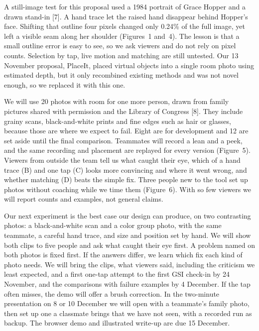 \documentclass[10pt,letterpaper]{article}
\begin{document}
A still-image test for this proposal used a 1984 portrait of Grace Hopper and a drawn stand-in [7]. A hand trace let the raised hand disappear behind Hopper's face. Shifting that outline four pixels changed only 0.24\% of the full image, yet left a visible seam along her shoulder (Figures~1 and~4). The lesson is that a small outline error is easy to see, so we ask viewers and do not rely on pixel counts. Selection by tap, live motion and matching are still untested. Our 13 November proposal, PlaceIt, placed virtual objects into a single room photo using estimated depth, but it only recombined existing methods and was not novel enough, so we replaced it with this one.

We will use 20 photos with room for one more person, drawn from family pictures shared with permission and the Library of Congress [8]. They include grainy scans, black-and-white prints and fine edges such as hair or glasses, because those are where we expect to fail. Eight are for development and 12 are set aside until the final comparison. Teammates will record a lean and a peek, and the same recording and placement are replayed for every version (Figure~5). Viewers from outside the team tell us what caught their eye, which of a hand trace (B) and one tap (C) looks more convincing and where it went wrong, and whether matching (D) beats the simple fix. Three people new to the tool set up photos without coaching while we time them (Figure~6). With so few viewers we will report counts and examples, not general claims.

Our next experiment is the best case our design can produce, on two contrasting photos: a black-and-white scan and a color group photo, with the same teammate, a careful hand trace, and size and position set by hand. We will show both clips to five people and ask what caught their eye first. A problem named on both photos is fixed first. If the answers differ, we learn which fix each kind of photo needs. We will bring the clips, what viewers said, including the criticism we least expected, and a first one-tap attempt to the first GSI check-in by 24 November, and the comparisons with failure examples by 4 December. If the tap often misses, the demo will offer a brush correction. In the two-minute presentation on 8 or 10 December we will open with a teammate's family photo, then set up one a classmate brings that we have not seen, with a recorded run as backup. The browser demo and illustrated write-up are due 15 December.
\end{document}
